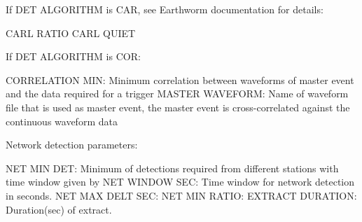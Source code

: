 If DET ALGORITHM is CAR, see Earthworm documentation for details: 

CARL RATIO \newline
CARL QUIET 

If DET ALGORITHM is COR: 

CORRELATION MIN: Minimum correlation between waveforms of master event 
and the data required for a trigger \newline
MASTER WAVEFORM: Name of waveform file that is used as master event, 
the master event is cross-correlated against the continuous waveform data 

Network detection parameters: 

NET MIN DET: Minimum of detections required from different stations with time window given by
\newline
NET WINDOW SEC: Time window for network detection in seconds. 
NET MAX DELT SEC:
NET MIN RATIO:
EXTRACT DURATION: Duration(sec) of extract.

